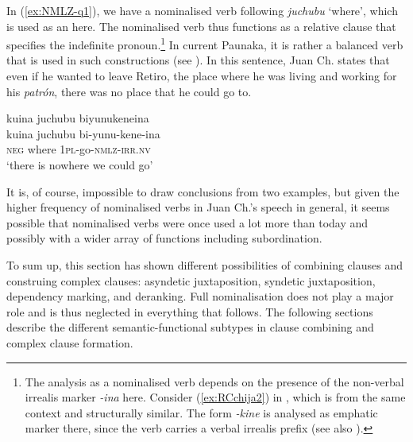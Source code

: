 In (\ref{ex:NMLZ-q1}), we have a nominalised verb following \textit{juchubu} ‘where’, which is used as an  here. The nominalised verb thus functions as a relative clause that specifies the indefinite pronoun.\footnote{The analysis as a nominalised verb depends on the presence of the non-verbal irrealis marker \textit{-ina} here. Consider (\ref{ex:RCchija2}) in , which is from the same context and structurally similar. The form \textit{-kine} is analysed as emphatic marker there, since the verb carries a verbal irrealis prefix (see also ).} In current Paunaka, it is rather a balanced verb that is used in such constructions (see ). In this sentence, Juan Ch. states that even if he wanted to leave Retiro, the place where he was living and working for his \textit{patrón}, there was no place that he could go to.

\ea\label{ex:NMLZ-q1}
\begingl
\glpreamble kuina juchubu biyunukeneina\\
\gla kuina juchubu bi-yunu-kene-ina\\
\glb \textsc{neg} where 1\textsc{pl}-go-\textsc{nmlz}-\textsc{irr.nv}\\
\glft ‘there is nowhere we could go’
\endgl
\trailingcitation{[nxx-p630101g-1.177]}
\xe

It is, of course, impossible to draw conclusions from two examples, but given the higher frequency of nominalised verbs in Juan Ch.’s speech in general, it seems possible that nominalised verbs were once used a lot more than today and possibly with a wider array of functions including subordination. 

To sum up, this section has shown different possibilities of combining clauses and construing complex clauses: asyndetic juxtaposition, syndetic juxtaposition, dependency marking, and deranking. Full nominalisation does not play a major role and is thus neglected in everything that follows. The following sections describe the different semantic-functional subtypes in clause combining and complex clause formation. 



